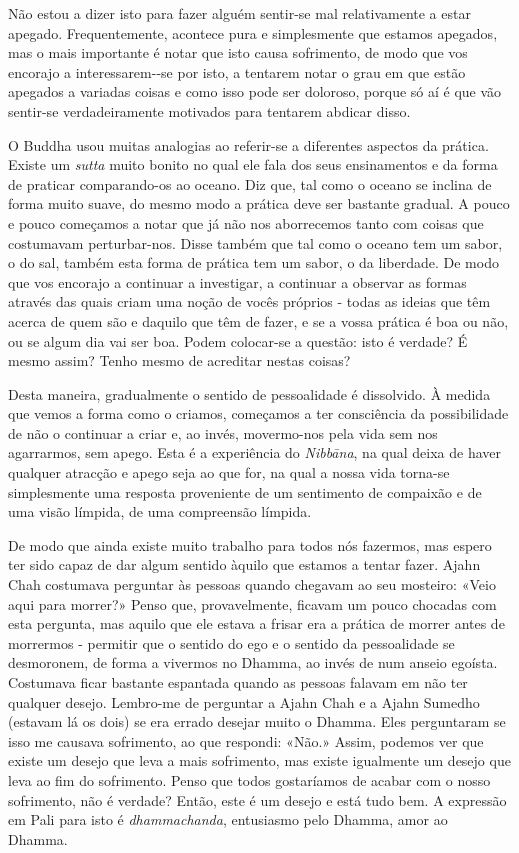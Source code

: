 Não estou a dizer isto para fazer alguém sentir-se mal relativamente a
estar apegado. Frequentemente, acontece pura e simplesmente que estamos
apegados, mas o mais importante é notar que isto causa sofrimento, de
modo que vos encorajo a interessarem-\linebreak-se por isto, a tentarem notar o
grau em que estão apegados a variadas coisas e como isso pode ser
doloroso, porque só aí é que vão sentir-se verdadeiramente motivados
para tentarem abdicar disso.

O Buddha usou muitas analogias ao referir-se a diferentes aspectos da
prática. Existe um \emph{sutta} muito bonito no qual ele fala dos seus
ensinamentos e da forma de praticar comparando-os ao oceano. Diz que,
tal como o oceano se inclina de forma muito suave, do mesmo modo a
prática deve ser bastante gradual. A pouco e pouco começamos a notar que
já não nos aborrecemos tanto com coisas que costumavam perturbar-nos.
Disse também que tal como o oceano tem um sabor, o do sal, também esta
forma de prática tem um sabor, o da liberdade. De modo que vos encorajo
a continuar a investigar, a continuar a observar as formas através das
quais criam uma noção de vocês próprios - todas as ideias que têm acerca
de quem são e daquilo que têm de fazer, e se a vossa prática é boa ou
não, ou se algum dia vai ser boa. Podem colocar-se a questão: isto é
verdade? É mesmo assim? Tenho mesmo de acreditar nestas coisas?

Desta maneira, gradualmente o sentido de pessoalidade é dissolvido. À
medida que vemos a forma como o criamos, começamos a ter consciência da
possibilidade de não o continuar a criar e, ao invés, movermo-nos pela
vida sem nos agarrarmos, sem apego. Esta é a experiência do
\emph{Nibbāna}, na qual deixa de haver qualquer atracção e apego seja ao
que for, na qual a nossa vida torna-se simplesmente uma resposta
proveniente de um sentimento de compaixão e de uma visão límpida, de uma
compreensão límpida.

De modo que ainda existe muito trabalho para todos nós fazermos, mas
espero ter sido capaz de dar algum sentido àquilo que estamos a tentar
fazer. Ajahn Chah costumava perguntar às pessoas quando chegavam ao seu
mosteiro: «Veio aqui para morrer?» Penso que, provavelmente, ficavam um
pouco chocadas com esta pergunta, mas aquilo que ele estava a frisar era
a prática de morrer antes de morrermos - permitir que o sentido do ego e
o sentido da pessoalidade se desmoronem, de forma a vivermos no Dhamma,
ao invés de num anseio egoísta. Costumava ficar bastante espantada
quando as pessoas falavam em não ter qualquer desejo. Lembro-me de
perguntar a Ajahn Chah e a Ajahn Sumedho (estavam lá os dois) se era
errado desejar muito o Dhamma. Eles perguntaram se isso me causava
sofrimento, ao que respondi: «Não.» Assim, podemos ver que existe um
desejo que leva a mais sofrimento, mas existe igualmente um desejo que
leva ao fim do sofrimento. Penso que todos gostaríamos de acabar com o
nosso sofrimento, não é verdade? Então, este é um desejo e está tudo
bem. A expressão em Pali para isto é \emph{dhammachanda}, entusiasmo
pelo Dhamma, amor ao Dhamma.

